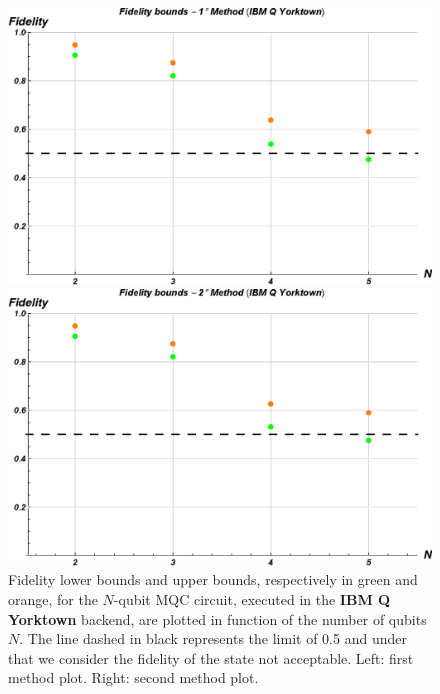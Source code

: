 \begin{figure}[h!]
\begin{minipage}[c]{0.5\linewidth}
\hspace{1cm}
\centering \includegraphics[width=1\textwidth]{./chapter3/graphics_IBM/real_device/F1Metodo.eps}
\end{minipage}
\begin{minipage}[]{0.5\linewidth}
\centering \includegraphics[width=1\textwidth]{./chapter3/graphics_IBM/real_device/F2Metodo.eps}
\end{minipage}
\caption{\label{Fidelity_RealDevice_ibmqx2} Fidelity lower bounds and upper bounds, respectively in green and orange, for the $N$-qubit MQC circuit, executed in the \textbf{IBM Q Yorktown} backend, are plotted in function of the number of qubits $N$. The line dashed in black represents the limit of 0.5 and under that we consider the fidelity of the state not acceptable. Left: first method plot. Right: second method plot.}
\end{figure}

